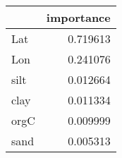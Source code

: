 \begin{tabular}{lr}
\toprule
 & importance \\
\midrule
Lat & 0.719613 \\
Lon & 0.241076 \\
silt & 0.012664 \\
clay & 0.011334 \\
orgC & 0.009999 \\
sand & 0.005313 \\
\bottomrule
\end{tabular}
